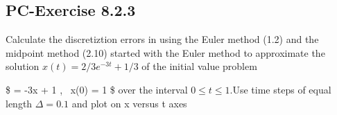 \documentclass[a4paper,dvipdfmx]{jsarticle}
\begin{document}
    \subsection{PC-Exercise 8.2.3}\label{pc-exercise-8.2.3}

Calculate the discretiztion errors in using the Euler method (1.2) and
the midpoint method (2.10) started with the Euler method to approximate
the solution \(x(t) = 2/3 e^{-3t} + 1/3\) of the initial value problem

\$  = -3x + 1 , ~x(0) = 1 \$ over the interval
\(0 \le t \le 1\).Use time steps of equal length \(\Delta = 0.1\) and
plot on x versus t axes


{\par%
\vspace{-1\baselineskip}%
}%
\end{document}
